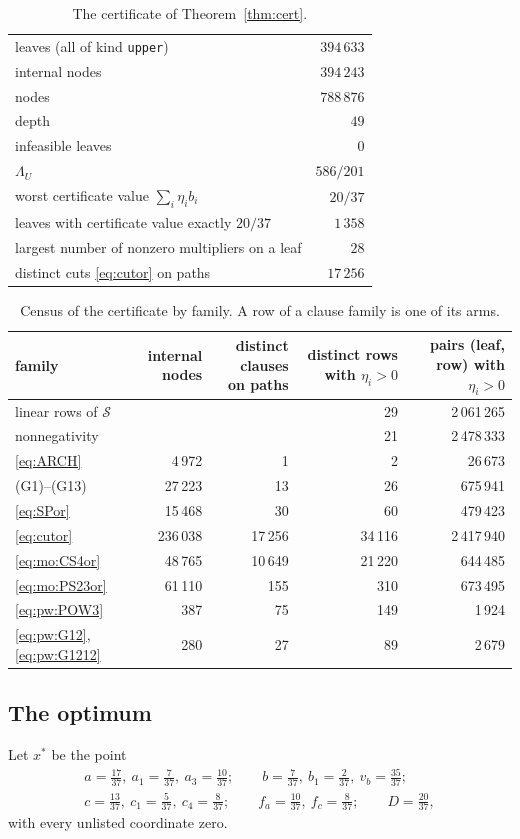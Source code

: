 \documentclass{amsart}
\theoremstyle{definition}
\theoremstyle{plain}
\numberwithin{equation}{section}
\numberwithin{table}{section}
\newcommand{\certLeaves}{394\,633}
\newcommand{\certInternal}{394\,243}
\newcommand{\certNodes}{788\,876}
\newcommand{\certDepth}{49}
\newcommand{\certInfeasible}{0}
\newcommand{\certLambda}{586/201}
\newcommand{\certTight}{1\,358}
\newcommand{\certMaxTerms}{28}
\newcommand{\certUNused}{17\,256}
\newcommand{\certFamilyTable}{%
linear rows of $\mathcal S$ & & & 29 & 2\,061\,265\\
nonnegativity & & & 21 & 2\,478\,333\\
\eqref{eq:ARCH} & 4\,972 & 1 & 2 & 26\,673\\
(G1)--(G13) & 27\,223 & 13 & 26 & 675\,941\\
\eqref{eq:SPor} & 15\,468 & 30 & 60 & 479\,423\\
\eqref{eq:cutor} & 236\,038 & 17\,256 & 34\,116 & 2\,417\,940\\
\eqref{eq:mo:CS4or} & 48\,765 & 10\,649 & 21\,220 & 644\,485\\
\eqref{eq:mo:PS23or} & 61\,110 & 155 & 310 & 673\,495\\
\eqref{eq:pw:POW3} & 387 & 75 & 149 & 1\,924\\
\eqref{eq:pw:G12}, \eqref{eq:pw:G1212} & 280 & 27 & 89 & 2\,679\\}
\begin{document}
\begin{table}[ht]
\centering\small
\caption{The certificate of Theorem~\ref{thm:cert}.}\label{tab:cert}
\begin{tabular}{@{}lr@{}}
\hline leaves (all of kind \texttt{upper}) & $\certLeaves$\\
internal nodes & $\certInternal$\\
nodes & $\certNodes$\\
depth & $\certDepth$\\
infeasible leaves & $\certInfeasible$\\
$\Lambda_U$ & $\certLambda$\\
worst certificate value $\sum_i\eta_i b_i$ & $20/37$\\
leaves with certificate value exactly $20/37$ & $\certTight$\\
largest number of nonzero multipliers on a leaf & $\certMaxTerms$\\
distinct cuts \eqref{eq:cutor} on paths & $\certUNused$\\
\hline
\end{tabular}
\end{table}

\begin{table}[ht]
\centering\small
\caption{Census of the certificate by family. A row of a clause family is
one of its arms.}\label{tab:fam}
\begin{tabular}{@{}lrrrr@{}}
\hline family & \shortstack[r]{internal\\nodes} & \shortstack[r]{distinct clauses\\on paths}
 & \shortstack[r]{distinct rows\\with $\eta_i>0$} & \shortstack[r]{pairs (leaf, row)\\with $\eta_i>0$}\\\hline
\certFamilyTable
\hline
\end{tabular}
\end{table}

\subsection{The optimum}\label{sec:witness}
Let $x^*$ be the point
\begin{equation}\label{eq:wit}
 \begin{gathered}
 a=\tfrac{17}{37},\ a_1=\tfrac7{37},\ a_3=\tfrac{10}{37};\qquad
 b=\tfrac7{37},\ b_1=\tfrac2{37},\ v_b=\tfrac{35}{37};\\
 c=\tfrac{13}{37},\ c_1=\tfrac5{37},\ c_4=\tfrac8{37};\qquad
 f_a=\tfrac{10}{37},\ f_c=\tfrac8{37};\qquad D=\tfrac{20}{37},
 \end{gathered}
\end{equation}
with every unlisted coordinate zero.
\end{document}
